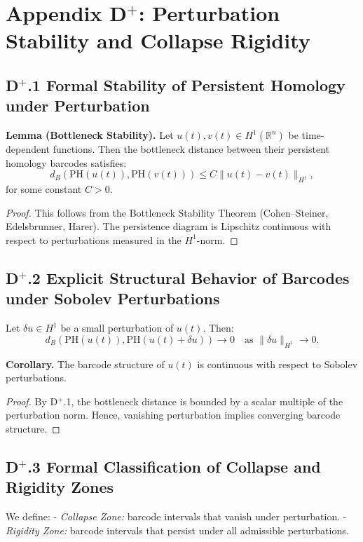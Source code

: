 \documentclass[11pt]{article}
\begin{document}
\section*{Appendix D$^+$: Perturbation Stability and Collapse Rigidity}

\subsection*{D$^+$.1 Formal Stability of Persistent Homology under Perturbation}
\textbf{Lemma (Bottleneck Stability).}  
Let \( u(t), v(t) \in H^1(\mathbb{R}^n) \) be time-dependent functions. Then the bottleneck distance between their persistent homology barcodes satisfies:
\[
d_B(\mathrm{PH}(u(t)), \mathrm{PH}(v(t))) \leq C \| u(t) - v(t) \|_{H^1},
\]
for some constant \( C > 0 \).

\begin{proof}
This follows from the Bottleneck Stability Theorem (Cohen–Steiner, Edelsbrunner, Harer). The persistence diagram is Lipschitz continuous with respect to perturbations measured in the \( H^1 \)-norm.
\end{proof}

\subsection*{D$^+$.2 Explicit Structural Behavior of Barcodes under Sobolev Perturbations}
Let \( \delta u \in H^1 \) be a small perturbation of \( u(t) \). Then:
\[
d_B(\mathrm{PH}(u(t)), \mathrm{PH}(u(t)+\delta u)) \to 0 \quad \text{as } \| \delta u \|_{H^1} \to 0.
\]

\textbf{Corollary.}  
The barcode structure of \( u(t) \) is continuous with respect to Sobolev perturbations.

\begin{proof}
By D$^+$.1, the bottleneck distance is bounded by a scalar multiple of the perturbation norm. Hence, vanishing perturbation implies converging barcode structure.
\end{proof}

\subsection*{D$^+$.3 Formal Classification of Collapse and Rigidity Zones}
We define:
- \textit{Collapse Zone:} barcode intervals that vanish under perturbation.
- \textit{Rigidity Zone:} barcode intervals that persist under all admissible perturbations.
\end{document}
